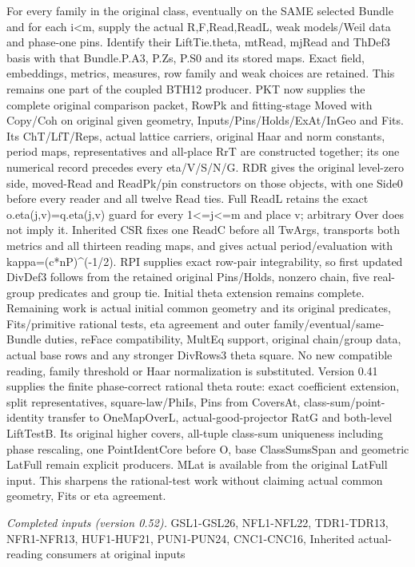 \documentclass[11pt,a4paper]{article}
\numberwithin{equation}{section}
\theoremstyle{remark}\newtheorem{remark}[theorem]{Remark}
\begin{document}
For every family in the original class, eventually on the SAME selected Bundle and for each i<m, supply the actual R,F,Read,ReadL, weak models/Weil data and phase-one pins. Identify their LiftTie.theta, mtRead, mjRead and ThDef3 basis with that Bundle.P.A3, P.Zs, P.S0 and its stored maps. Exact field, embeddings, metrics, measures, row family and weak choices are retained. This remains one part of the coupled BTH12 producer. PKT now supplies the complete original comparison packet, RowPk and fitting-stage Moved with Copy/Coh on original given geometry, Inputs/Pins/Holds/ExAt/InGeo and Fits. Its ChT/LfT/Reps, actual lattice carriers, original Haar and norm constants, period maps, representatives and all-place RrT are constructed together; its one numerical record precedes every eta/V/S/N/G. RDR gives the original level-zero side, moved-Read and ReadPk/pin constructors on those objects, with one Side0 before every reader and all twelve Read ties. Full ReadL retains the exact o.eta(j,v)=q.eta(j,v) guard for every 1<=j<=m and place v; arbitrary Over does not imply it. Inherited CSR fixes one ReadC before all TwArgs, transports both metrics and all thirteen reading maps, and gives actual period/evaluation with kappa=(c*nP)\textasciicircum{}(-1/2). RPI supplies exact row-pair integrability, so first updated DivDef3 follows from the retained original Pins/Holds, nonzero chain, five real-group predicates and group tie. Initial theta extension remains complete. Remaining work is actual initial common geometry and its original predicates, Fits/primitive rational tests, eta agreement and outer family/eventual/same-Bundle duties, reFace compatibility, MultEq support, original chain/group data, actual base rows and any stronger DivRows3 theta square. No new compatible reading, family threshold or Haar normalization is substituted. Version 0.41 supplies the finite phase-correct rational theta route: exact coefficient extension, split representatives, square-law/PhiIs, Pins from CoversAt, class-sum/point-identity transfer to OneMapOverL, actual-good-projector RatG and both-level LiftTestB. Its original higher covers, all-tuple class-sum uniqueness including phase rescaling, one PointIdentCore before O, base ClassSumsSpan and geometric LatFull remain explicit producers. MLat is available from the original LatFull input. This sharpens the rational-test work without claiming actual common geometry, Fits or eta agreement.

\emph{Completed inputs (version 0.52).} GSL1-GSL26, NFL1-NFL22, TDR1-TDR13, NFR1-NFR13, HUF1-HUF21, PUN1-PUN24, CNC1-CNC16, Inherited actual-reading consumers at original inputs
\end{document}

